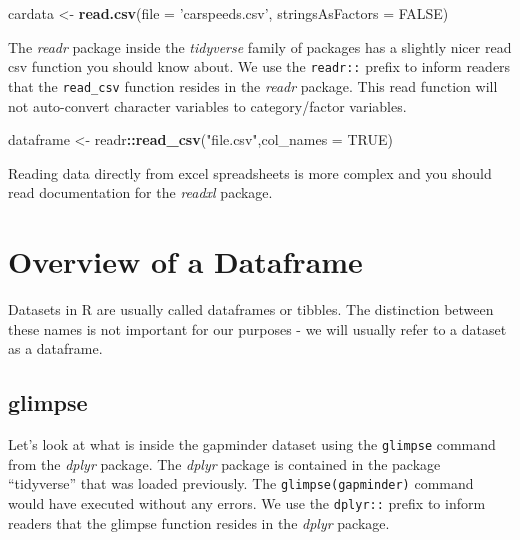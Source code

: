 \documentclass[
]{book}
\newenvironment{Shaded}{\begin{snugshade}}{\end{snugshade}}
\newcommand{\DataTypeTok}[1]{\textcolor[rgb]{0.13,0.29,0.53}{#1}}
\newcommand{\KeywordTok}[1]{\textcolor[rgb]{0.13,0.29,0.53}{\textbf{#1}}}
\newcommand{\NormalTok}[1]{#1}
\newcommand{\OperatorTok}[1]{\textcolor[rgb]{0.81,0.36,0.00}{\textbf{#1}}}
\newcommand{\OtherTok}[1]{\textcolor[rgb]{0.56,0.35,0.01}{#1}}
\newcommand{\StringTok}[1]{\textcolor[rgb]{0.31,0.60,0.02}{#1}}
\begin{document}
\begin{Shaded}
\begin{Highlighting}[]
\NormalTok{cardata <-}\StringTok{ }\KeywordTok{read.csv}\NormalTok{(}\DataTypeTok{file =} \StringTok{'carspeeds.csv'}\NormalTok{, }\DataTypeTok{stringsAsFactors =} \OtherTok{FALSE}\NormalTok{)}
\end{Highlighting}
\end{Shaded}

The \emph{readr} package inside the \emph{tidyverse} family of packages has a slightly nicer read csv function you should know about. We use the \texttt{readr::} prefix to inform readers that the \texttt{read\_csv} function resides in the \emph{readr} package. This read function will not auto-convert character variables to category/factor variables.

\begin{Shaded}
\begin{Highlighting}[]
\NormalTok{dataframe <-}\StringTok{ }\NormalTok{readr}\OperatorTok{::}\KeywordTok{read_csv}\NormalTok{(}\StringTok{"file.csv"}\NormalTok{,}\DataTypeTok{col_names =} \OtherTok{TRUE}\NormalTok{)}
\end{Highlighting}
\end{Shaded}

Reading data directly from excel spreadsheets is more complex and you should read documentation for the \emph{readxl} package.

\hypertarget{OverviewDataframe}{%
\chapter{Overview of a Dataframe}\label{OverviewDataframe}}

Datasets in R are usually called dataframes or tibbles. The distinction between these names is not important for our purposes - we will usually refer to a dataset as a dataframe.

\hypertarget{glimpse}{%
\section{glimpse}\label{glimpse}}

Let's look at what is inside the gapminder dataset using the \texttt{glimpse} command from the \emph{dplyr} package. The \emph{dplyr} package is contained in the package ``tidyverse'' that was loaded previously. The \texttt{glimpse(gapminder)} command would have executed without any errors. We use the \texttt{dplyr::} prefix to inform readers that the glimpse function resides in the \emph{dplyr} package.
\end{document}
